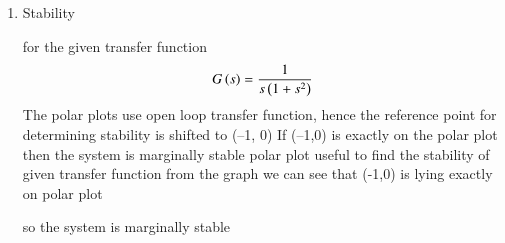 \begin{enumerate}[label=\thesection.\arabic*.,ref=\thesection.\theenumi]
\item
 Stability

\break for the given transfer function 
\begin{align}
    G\left(s\right) = \frac{1}{s\left(1+s^{2}\right)}
\end{align}
The polar plots use open loop transfer function, hence the reference point for determining
stability is shifted to (–1, 0)
\center
 If (–1,0) is exactly on the polar plot then the system is marginally stable
polar plot useful to find the stability of given transfer function
from the graph we can see that (-1,0) is lying exactly on polar plot


\center so the system is marginally stable
\end{enumerate}
